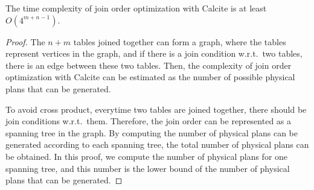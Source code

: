 \begin{theorem}
    \label{theorem:complexity-of-calcite}
    The time complexity of join order optimization with Calcite is at least $O(4^{m+n-1})$.
\end{theorem}
\begin{proof}
    The $n + m$ tables joined together can form a graph, where the tables represent vertices in the graph, and if there is a join condition w.r.t.~two tables, there is an edge between these two tables.
    Then, the complexity of join order optimization with Calcite can be estimated as the number of possible physical plans that can be generated.
    
    To avoid cross product, everytime two tables are joined together, there should be join conditions w.r.t.~them.
    Therefore, the join order can be represented as a spanning tree in the graph.
    By computing the number of physical plans can be generated according to each spanning tree, the total number of physical plans can be obtained.
    In this proof, we compute the number of physical plans for one spanning tree, and this number is the lower bound of the number of physical plans that can be generated.


\end{proof}
